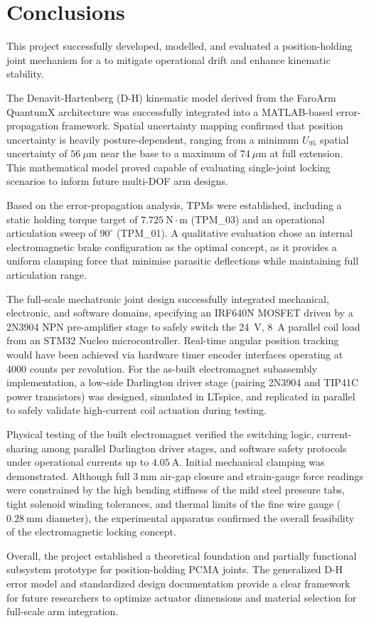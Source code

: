 \chapter{Conclusions}

This project successfully developed, modelled, and evaluated a position-holding joint mechanism for a to mitigate operational drift and enhance kinematic stability.

The Denavit-Hartenberg (D-H) kinematic model derived from the FaroArm QuantumX architecture was successfully integrated into a MATLAB-based error-propagation framework. Spatial uncertainty mapping confirmed that position uncertainty is heavily posture-dependent, ranging from a minimum $U_{95}$ spatial uncertainty of $56~\mu\text{m}$ near the base to a maximum of $74~\mu\text{m}$ at full extension. This mathematical model proved capable of evaluating single-joint locking scenarios to inform future multi-DOF arm designs.
	
Based on the error-propagation analysis, TPMs were established, including a static holding torque target of $7.725~\text{N}\cdot\text{m}$ (TPM\_03) and an operational articulation sweep of $90^\circ$ (TPM\_01). A qualitative evaluation chose an internal electromagnetic brake configuration as the optimal concept, as it provides a uniform clamping force that minimise parasitic deflections while maintaining full articulation range.

The full-scale mechatronic joint design successfully integrated mechanical, electronic, and software domains, specifying an IRF640N MOSFET driven by a 2N3904 NPN pre-amplifier stage to safely switch the 24~V, 8~A parallel coil load from an STM32 Nucleo microcontroller. Real-time angular position tracking would have been achieved via hardware timer encoder interfaces operating at 4000 counts per revolution. For the as-built electromagnet subassembly implementation, a low-side Darlington driver stage (pairing 2N3904 and TIP41C power transistors) was designed, simulated in LTspice, and replicated in parallel to safely validate high-current coil actuation during testing.
	
Physical testing of the built electromagnet verified the switching logic, current-sharing among parallel Darlington driver stages, and software safety protocols under operational currents up to $4.05~\text{A}$. Initial mechanical clamping was demonstrated. Although full $3~\text{mm}$ air-gap closure and strain-gauge force readings were constrained by the high bending stiffness of the mild steel pressure tabs, tight solenoid winding tolerances, and thermal limits of the fine wire gauge ($0.28~\text{mm}$ diameter), the experimental apparatus confirmed the overall feasibility of the electromagnetic locking concept.

Overall, the project established a theoretical foundation and partially functional subsystem prototype for position-holding PCMA joints. The generalized D-H error model and standardized design documentation provide a clear framework for future researchers to optimize actuator dimensions and material selection for full-scale arm integration.